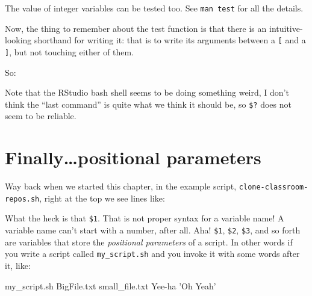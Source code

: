 \documentclass[]{krantz}
\makeatletter
\newenvironment{Shaded}{\begin{snugshade}}{\end{snugshade}}
\newcommand{\BuiltInTok}[1]{#1}
\newcommand{\CommentTok}[1]{\textcolor[rgb]{0.37,0.37,0.37}{\textit{#1}}}
\newcommand{\ExtensionTok}[1]{#1}
\newcommand{\NormalTok}[1]{#1}
\newcommand{\OtherTok}[1]{\textcolor[rgb]{0.37,0.37,0.37}{#1}}
\newcommand{\StringTok}[1]{\textcolor[rgb]{0.5,0.5,0.5}{#1}}
\newcommand{\VariableTok}[1]{\textcolor[rgb]{0,0,0}{#1}}
\newenvironment{kframe}{%
\medskip{}
\setlength{\fboxsep}{.8em}
 \def\at@end@of@kframe{}%
 \ifinner\ifhmode%
  \def\at@end@of@kframe{\end{minipage}}%
  \begin{minipage}{\columnwidth}%
 \fi\fi%
 \def\FrameCommand##1{\hskip\@totalleftmargin \hskip-\fboxsep
 \colorbox{shadecolor}{##1}\hskip-\fboxsep
     \hskip-\linewidth \hskip-\@totalleftmargin \hskip\columnwidth}%
 \MakeFramed {\advance\hsize-\width
   \@totalleftmargin\z@ \linewidth\hsize
   \@setminipage}}%
 {\par\unskip\endMakeFramed%
 \at@end@of@kframe}
\renewenvironment{Shaded}{\begin{kframe}}{\end{kframe}}
\makeatother
\begin{document}
The value of integer variables can be tested too. See \texttt{man\ test} for
all the details.

Now, the thing to remember about the test function is that there
is an intuitive-looking shorthand for writing it: that is to write
its arguments between a \texttt{{[}} and a \texttt{{]}}, but not touching either of them.

So:

\begin{Shaded}
\end{Shaded}

Note that the RStudio bash shell seems to be doing something weird,
I don't think the ``last command'' is quite what we think it should be,
so \texttt{\$?} does not seem to be reliable.

\hypertarget{finallypositional-parameters}{%
\section{Finally\ldots{}positional parameters}\label{finallypositional-parameters}}

Way back when we started this chapter, in the example script, \texttt{clone-classroom-repos.sh},
right at the top we see lines like:

\begin{Shaded}
\end{Shaded}

What the heck is that \texttt{\$1}. That is not proper syntax for a variable name! A variable
name can't start with a number, after all. Aha! \texttt{\$1}, \texttt{\$2}, \texttt{\$3}, and so forth are
variables that store the \emph{positional parameters} of a script. In other words if you write a
script called \texttt{my\_script.sh} and you invoke it with some words after it, like:

\begin{Shaded}
\begin{Highlighting}[]
\ExtensionTok{my_script.sh}\NormalTok{  BigFile.txt  small_file.txt  Yee-ha   }\StringTok{'Oh Yeah'}
\end{Highlighting}
\end{Shaded}
\end{document}
